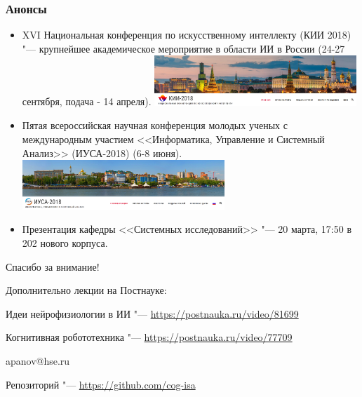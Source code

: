 \documentclass[default]{beamer}
\begin{document}
	\begin{frame}
		\frametitle{Анонсы}
		\small
		\begin{itemize}
			\item XVI Национальная конференция по искусственному интеллекту (КИИ 2018) "--- крупнейшее академическое мероприятие в области ИИ в России (24-27 сентября, подача - 14 апреля).
			\includegraphics[width=0.6\textwidth]{rncai.png}
			\item Пятая всероссийская научная конференция молодых ученых с международным участием <<Информатика, Управление и Системный Анализ>> (ИУСА-2018) (6-8 июня).
			\includegraphics[width=0.6\textwidth]{icsa.png}
			\item Презентация кафедры <<Системных исследований>> "--- 20 марта, 17:50 в 202 нового корпуса.
		\end{itemize}
	\end{frame}
				
	\begin{frame}
		\centering
		\Huge
		Спасибо за внимание!
		\normalsize
		\par\bigskip
		Дополнительно лекции на Постнауке:
		\par\medskip
		Идеи нейрофизиологии в ИИ "--- \url{https://postnauka.ru/video/81699}
		
		Когнитивная робототехника "--- \url{https://postnauka.ru/video/77709}
		\par\bigskip
		\par\bigskip
		apanov@hse.ru
		\par\bigskip
		Репозиторий "--- \url{https://github.com/cog-isa}
	\end{frame}			
\end{document}
